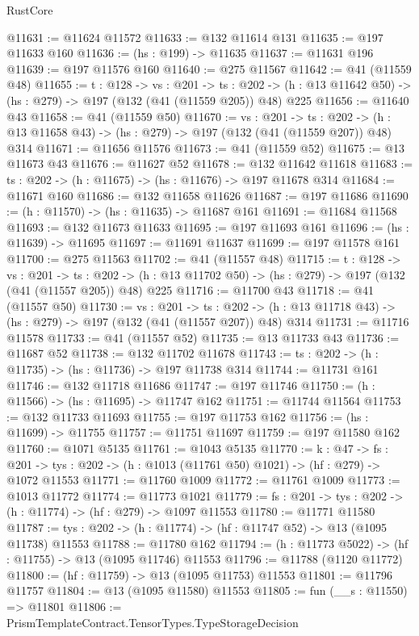 \begin{lexlean}{RustCore}
\begin{coremodule}
@11631 := @11624 @11572
@11633 := @132 @11614 @131
@11635 := @197 @11633 @160
@11636 := (hs : @199) -> @11635
@11637 := @11631 @196
@11639 := @197 @11576 @160
@11640 := @275 @11567
@11642 := @41 (@11559 @48)
@11655 := {t : @128} ->
  {vs : @201} ->
  {ts : @202} -> (h : @13 @11642 @50) -> (hs : @279) -> @197 (@132 (@41 (@11559 @205)) @48) @225
@11656 := @11640 @43
@11658 := @41 (@11559 @50)
@11670 := {vs : @201} ->
  {ts : @202} -> (h : @13 @11658 @43) -> (hs : @279) -> @197 (@132 (@41 (@11559 @207)) @48) @314
@11671 := @11656 @11576
@11673 := @41 (@11559 @52)
@11675 := @13 @11673 @43
@11676 := @11627 @52
@11678 := @132 @11642 @11618
@11683 := {ts : @202} -> (h : @11675) -> (hs : @11676) -> @197 @11678 @314
@11684 := @11671 @160
@11686 := @132 @11658 @11626
@11687 := @197 @11686
@11690 := (h : @11570) -> (hs : @11635) -> @11687 @161
@11691 := @11684 @11568
@11693 := @132 @11673 @11633
@11695 := @197 @11693 @161
@11696 := (hs : @11639) -> @11695
@11697 := @11691 @11637
@11699 := @197 @11578 @161
@11700 := @275 @11563
@11702 := @41 (@11557 @48)
@11715 := {t : @128} ->
  {vs : @201} ->
  {ts : @202} -> (h : @13 @11702 @50) -> (hs : @279) -> @197 (@132 (@41 (@11557 @205)) @48) @225
@11716 := @11700 @43
@11718 := @41 (@11557 @50)
@11730 := {vs : @201} ->
  {ts : @202} -> (h : @13 @11718 @43) -> (hs : @279) -> @197 (@132 (@41 (@11557 @207)) @48) @314
@11731 := @11716 @11578
@11733 := @41 (@11557 @52)
@11735 := @13 @11733 @43
@11736 := @11687 @52
@11738 := @132 @11702 @11678
@11743 := {ts : @202} -> (h : @11735) -> (hs : @11736) -> @197 @11738 @314
@11744 := @11731 @161
@11746 := @132 @11718 @11686
@11747 := @197 @11746
@11750 := (h : @11566) -> (hs : @11695) -> @11747 @162
@11751 := @11744 @11564
@11753 := @132 @11733 @11693
@11755 := @197 @11753 @162
@11756 := (hs : @11699) -> @11755
@11757 := @11751 @11697
@11759 := @197 @11580 @162
@11760 := @1071 @5135
@11761 := @1043 @5135
@11770 := {k : @47} ->
  {fs : @201} -> {tys : @202} -> (h : @1013 (@11761 @50) @1021) -> (hf : @279) -> @1072 @11553
@11771 := @11760 @1009
@11772 := @11761 @1009
@11773 := @1013 @11772
@11774 := @11773 @1021
@11779 := {fs : @201} -> {tys : @202} -> (h : @11774) -> (hf : @279) -> @1097 @11553
@11780 := @11771 @11580
@11787 := {tys : @202} -> (h : @11774) -> (hf : @11747 @52) -> @13 (@1095 @11738) @11553
@11788 := @11780 @162
@11794 := (h : @11773 @5022) -> (hf : @11755) -> @13 (@1095 @11746) @11553
@11796 := @11788 (@1120 @11772)
@11800 := (hf : @11759) -> @13 (@1095 @11753) @11553
@11801 := @11796 @11757
@11804 := @13 (@1095 @11580) @11553
@11805 := fun (__s : @11550) => @11801
@11806 := PrismTemplateContract.TensorTypes.TypeStorageDecision

\end{coremodule}
\end{lexlean}
